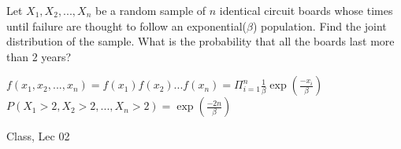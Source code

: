 \begin{ex}
Let $X_1, X_2, ..., X_n$ be a random sample of $n$ identical circuit boards whose times until failure are thought to follow an exponential($\beta$) population. Find the joint distribution of the sample. What is the probability that all the boards last more than 2 years?
\end{ex}
\begin{ans}
$f(x_1, x_2, ..., x_n)  = f(x_1) f(x_2) ... f(x_n) = \Pi_{i=1}^n \frac{1}{\beta} \exp(\frac{-x_i}{\beta})$ \\
$P(X_1 > 2, X_2 > 2, ..., X_n > 2) = \exp(\frac{-2n}{\beta})$
\end{ans}
\begin{source}
    Class, Lec 02
\end{source}
